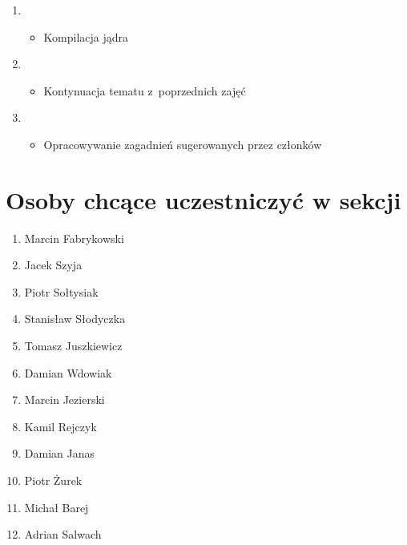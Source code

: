 \documentclass[a4paper,12pt]{article}
\begin{document}
\begin{enumerate}
\begin{itemize}
	\end{itemize}
\item \begin{itemize}
		\item Kompilacja jądra
	\end{itemize}
\item \begin{itemize}
		\item Kontynuacja tematu z~poprzednich zajęć
	\end{itemize}
\item \begin{itemize}
		\item Opracowywanie zagadnień sugerowanych przez członków
	\end{itemize}
\end{enumerate}
\section{Osoby chcące uczestniczyć w sekcji}
\begin{enumerate}
\item Marcin Fabrykowski
\item Jacek Szyja
\item Piotr Sołtysiak
\item Stanisław Słodyczka
\item Tomasz Juszkiewicz
\item Damian Wdowiak
\item Marcin Jezierski
\item Kamil Rejczyk
\item Damian Janas
\item Piotr Żurek
\item Michał Barej
\item Adrian Salwach
\end{enumerate}
\end{document}
